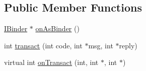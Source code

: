 \subsection*{Public Member Functions}
\begin{DoxyCompactItemize}
\item 
\hyperlink{classIBinder}{I\-Binder} $\ast$ \hyperlink{classBnInterface_a1562cc058795bdbf837a50ccf1510c1b}{on\-As\-Binder} ()
\item 
int \hyperlink{classBBinder_a3017278da0f18ac1280f328ac1cab221}{transact} (int code, int $\ast$msg, int $\ast$reply)
\item 
virtual int \hyperlink{classBBinder_addc75a03848c5555aff5a45f08f86898}{on\-Transact} (int, int $\ast$, int $\ast$)
\end{DoxyCompactItemize}


